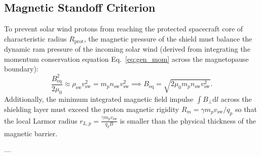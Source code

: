 \documentclass[11pt,a4paper]{article}
\newcommand{\dd}{\mathrm{d}}
\begin{document}
\subsection{Magnetic Standoff Criterion}
To prevent solar wind protons from reaching the protected spacecraft core of characteristic radius $R_{\text{prot}}$, the magnetic pressure of the shield must balance the dynamic ram pressure of the incoming solar wind (derived from integrating the momentum conservation equation Eq.~\ref{eq:gen_mom} across the magnetopause boundary):
\begin{equation}
    \frac{B_{\text{eq}}^2}{2\mu_0} \approx \rho_{\text{sw}} v_{\text{sw}}^2 = m_p n_{\text{sw}} v_{\text{sw}}^2 \implies B_{\text{eq}} = \sqrt{2 \mu_0 m_p n_{\text{sw}} v_{\text{sw}}^2}.
\end{equation}
Additionally, the minimum integrated magnetic field impulse $\int B_\perp \dd l$ across the shielding layer must exceed the proton magnetic rigidity $R_m = \gamma m_p v_{\text{sw}} / q_p$ so that the local Larmor radius $r_{L,p} = \frac{\gamma m_p v_{\text{sw}}}{q_p B}$ is smaller than the physical thickness of the magnetic barrier.

---
\end{document}
